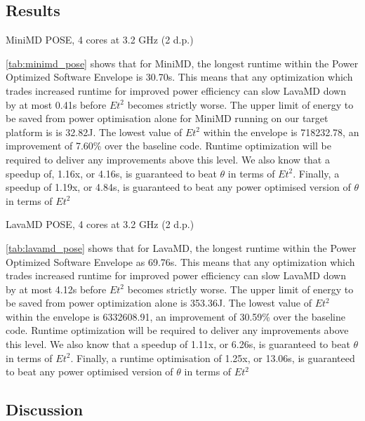 \subsection{Results}

\begin{table}
\centering
\caption{MiniMD POSE, 4 cores at 3.2 GHz (2 d.p.)}

\label{tab:minimd_pose}
\end{table} 

\autoref{tab:minimd_pose} shows that for MiniMD, the longest runtime within the Power Optimized Software Envelope is 30.70s.
This means that any optimization which trades increased runtime for improved power efficiency can slow LavaMD down by at most 0.41s before $Et^2$ becomes strictly worse.
The upper limit of energy to be saved from power optimisation alone for MiniMD running on our target platform is is 32.82J.
The lowest value of $Et^2$ within the envelope is 718232.78, an improvement of 7.60\% over the baseline code. 
Runtime optimization will be required to deliver any improvements above this level.
We also know that a speedup of, 1.16x, or 4.16s, is guaranteed to beat $\theta$ in terms of $Et^2$.
Finally, a speedup of 1.19x, or 4.84s, is guaranteed to beat any power optimised version of $\theta$ in terms of $Et^2$

\begin{table}
\centering
\caption{LavaMD POSE, 4 cores at 3.2 GHz (2 d.p.)}

\label{tab:lavamd_pose}
\end{table} 

\autoref{tab:lavamd_pose} shows that for LavaMD, the longest runtime within the Power Optimized Software Envelope as 69.76s.
This means that any optimization which trades increased runtime for improved power efficiency can slow LavaMD down by at most 4.12s before $Et^2$ becomes strictly worse.
The upper limit of energy to be saved from power optimization alone is 353.36J.
The lowest value of $Et^2$ within the envelope is 6332608.91, an improvement of 30.59\% over the baseline code.
Runtime optimization will be required to deliver any improvements above this level.
We also know that a speedup of 1.11x, or 6.26s, is guaranteed to beat $\theta$ in terms of $Et^2$.
Finally, a runtime optimisation of 1.25x, or 13.06s, is guaranteed to beat any power optimised version of $\theta$ in terms of $Et^2$ 

\subsection{Discussion}

